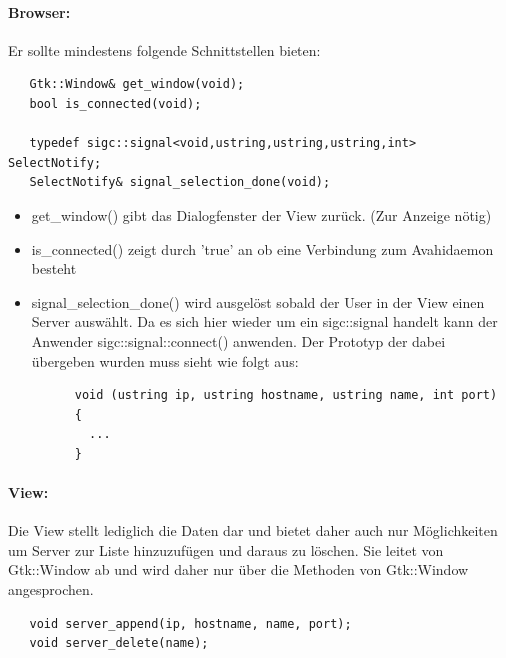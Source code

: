 \paragraph{Browser:}
Er sollte mindestens folgende Schnittstellen bieten:
\begin{verbatim}
   Gtk::Window& get_window(void);
   bool is_connected(void);

   typedef sigc::signal<void,ustring,ustring,ustring,int> SelectNotify;
   SelectNotify& signal_selection_done(void);
\end{verbatim}
\begin{itemize}
\item get\_window() gibt das Dialogfenster der View zurück. (Zur Anzeige nötig)
\item is\_connected() zeigt durch 'true' an ob eine Verbindung zum Avahidaemon besteht
\item signal\_selection\_done() wird ausgelöst sobald der User in der View einen Server auswählt. 
      Da es sich hier wieder um ein sigc::signal handelt kann der Anwender sigc::signal::connect() anwenden.
      Der Prototyp der dabei übergeben wurden muss sieht wie folgt aus:
      \begin{verbatim}
      void (ustring ip, ustring hostname, ustring name, int port)
      {
        ...
      }
      \end{verbatim}
\end{itemize}

\paragraph{View:}
Die View stellt lediglich die Daten dar und bietet daher auch nur Möglichkeiten um Server zur Liste hinzuzufügen
und daraus zu löschen. Sie leitet von Gtk::Window ab und wird daher nur über die Methoden von Gtk::Window angesprochen.
\begin{verbatim}
   void server_append(ip, hostname, name, port);
   void server_delete(name);
\end{verbatim}
